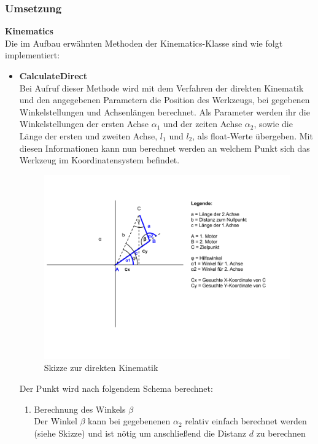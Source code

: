 \subsubsection{Umsetzung}
\textbf{Kinematics}\\
Die im Aufbau erwähnten Methoden der Kinematics-Klasse sind wie folgt implementiert:
\begin{itemize}
\item \textbf{CalculateDirect}\\
Bei Aufruf dieser Methode wird mit dem Verfahren der direkten Kinematik und den angegebenen Parametern die Position des Werkzeugs, bei gegebenen Winkelstellungen und Achsenlängen berechnet. Als Parameter werden ihr die Winkelstellungen der ersten Achse $\alpha_1$ und der zeiten Achse $\alpha_2$, sowie die Länge der ersten und zweiten Achse, $l_1$ und $l_2$, als float-Werte übergeben. Mit diesen Informationen kann nun berechnet werden an welchem Punkt sich das Werkzeug im Koordinatensystem befindet.\\
\begin{figure}[H]
  \centering
  \begin{minipage}[t]{12 cm}
  	\centering
  	\includegraphics[width=12cm]{images/Direktkinematik} 
    \caption{Skizze zur direkten Kinematik}
  \end{minipage}
\end{figure}
Der Punkt wird nach folgendem Schema berechnet:
\begin{enumerate}
\item Berechnung des Winkels $\beta$\\
Der Winkel $\beta$ kann bei gegebenenen $\alpha_2$ relativ einfach berechnet werden (siehe Skizze) und ist nötig um anschließend die Distanz $d$ zu berechnen\\

\end{enumerate}
\end{itemize}
